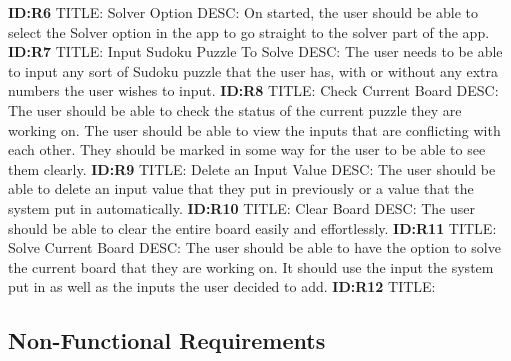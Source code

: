 \documentclass{article}
\begin{document}
\textbf{ID:R6} \newline TITLE: Solver Option \newline DESC: On started, the user should be able to select the Solver option in the app to go straight to the solver part of the app. \newline
\textbf{ID:R7} \newline TITLE: Input Sudoku Puzzle To Solve \newline DESC: The user needs to be able to input any sort of Sudoku puzzle that the user has, with or without any extra numbers the user wishes to input. \newline
\textbf{ID:R8} \newline TITLE: Check Current Board \newline DESC: The user should be able to check the status of the current puzzle they are working on. The user should be able to view the inputs that are conflicting with each other. They should be marked in some way for the user to be able to see them clearly. \newline
\textbf{ID:R9} \newline TITLE: Delete an Input Value \newline DESC: The user should be able to delete an input value that they put in previously or a value that the system put in automatically. \newline
\textbf{ID:R10} \newline TITLE: Clear Board \newline DESC: The user should be able to clear the entire board easily and effortlessly. \newline
\textbf{ID:R11} \newline TITLE: Solve Current Board \newline DESC: The user should be able to have the option to solve the current board that they are working on. It should use the input the system put in as well as the inputs the user decided to add. \newline
\textbf{ID:R12} \newline TITLE:



\subsection{Non-Functional Requirements} 
\end{document}

